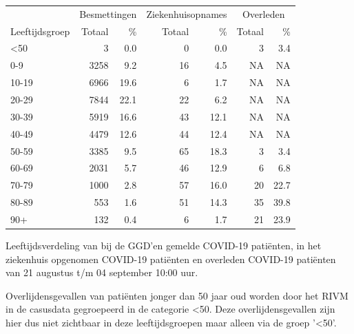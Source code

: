 \documentclass[
  english,
  man,floatsintext]{apa6}
\begin{document}
\begin{table}
\centering\begingroup\fontsize{11}{13}\selectfont

\begin{threeparttable}
\begin{tabular}{lrrrrrr}
\toprule
\multicolumn{1}{c}{ } & \multicolumn{2}{c}{Besmettingen} & \multicolumn{2}{c}{Ziekenhuisopnames} & \multicolumn{2}{c}{Overleden} \\
\cmidrule(l{3pt}r{3pt}){2-3} \cmidrule(l{3pt}r{3pt}){4-5} \cmidrule(l{3pt}r{3pt}){6-7}
Leeftijdsgroep & Totaal & \% & Totaal & \% & Totaal & \%\\
\midrule
<50 & 3 & 0.0 & 0 & 0.0 & 3 & 3.4\\
0-9 & 3258 & 9.2 & 16 & 4.5 & NA & NA\\
10-19 & 6966 & 19.6 & 6 & 1.7 & NA & NA\\
20-29 & 7844 & 22.1 & 22 & 6.2 & NA & NA\\
30-39 & 5919 & 16.6 & 43 & 12.1 & NA & NA\\
40-49 & 4479 & 12.6 & 44 & 12.4 & NA & NA\\
50-59 & 3385 & 9.5 & 65 & 18.3 & 3 & 3.4\\
60-69 & 2031 & 5.7 & 46 & 12.9 & 6 & 6.8\\
70-79 & 1000 & 2.8 & 57 & 16.0 & 20 & 22.7\\
80-89 & 553 & 1.6 & 51 & 14.3 & 35 & 39.8\\
90+ & 132 & 0.4 & 6 & 1.7 & 21 & 23.9\\
\bottomrule
\end{tabular}
\begin{tablenotes}
\item[1] Leeftijdsverdeling van bij de GGD’en gemelde COVID-19 patiënten, in het ziekenhuis opgenomen COVID-19 patiënten en overleden COVID-19 patiënten van 21 augustus t/m 04 september 10:00 uur.
\item[2] Overlijdensgevallen van patiënten jonger dan 50 jaar oud worden door het RIVM in de casusdata gegroepeerd in de categorie <50. Deze overlijdensgevallen zijn hier dus niet zichtbaar in deze leeftijdsgroepen maar alleen via de groep '<50'.
\end{tablenotes}
\end{threeparttable}
\endgroup{}
\end{table}

\newpage
\end{document}
